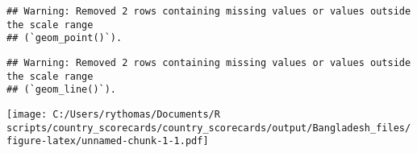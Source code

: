 \documentclass{article}
\begin{document}
\begin{verbatim}
## Warning: Removed 2 rows containing missing values or values outside the scale range
## (`geom_point()`).
\end{verbatim}

\begin{verbatim}
## Warning: Removed 2 rows containing missing values or values outside the scale range
## (`geom_line()`).
\end{verbatim}

\texttt{[image: C:/Users/rythomas/Documents/R scripts/country\_scorecards/country\_scorecards/output/Bangladesh\_files/figure-latex/unnamed-chunk-1-1.pdf]}
\end{document}
